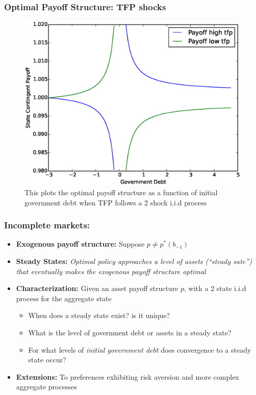 \documentclass{beamer}
\begin{document}
  \begin{frame}
   \frametitle{Optimal Payoff Structure: TFP shocks}
	\begin{figure}
		\begin{center}
		\includegraphics[scale=.4]{Images/p_graph_tfp.eps}
		\caption{This plots the optimal payoff structure as a function of initial government debt when TFP follows a 2 shock i.i.d process}
	\end{center}	 
	\end{figure}

  \end{frame}
  

\begin{frame}
	\frametitle{Incomplete markets:}
	\begin{itemize}
		\item  \textbf{Exogenous payoff structure:} Suppose $p\neq p^*(b_{-1})$
		\item \textbf{Steady States: }\emph{Optimal policy approaches a level of assets (``steady
		sate'') that eventually  makes the exogenous payoff structure optimal}
		
		\item \textbf{Characterization: } Given an asset payoff structure $p$, with  a 2 state i.i.d process for the aggregate state
		\begin{itemize}
			\item When does a steady state exist? is it unique?
			\item What is the level of government debt or   assets in a steady state?
			\item For what levels of  \emph{initial government debt} does  convergence to a steady state occur?
 			\end{itemize}
		\item  \textbf{Extensions: } To preferences exhibiting risk aversion and more complex aggregate processes
	\end{itemize}
\end{frame}
\end{document}

